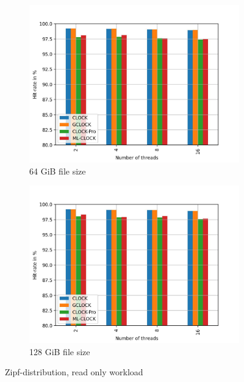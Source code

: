 \documentclass[
	12pt,
	a4paper,
	abstract,
	bibliography=totoc,
	chapterprefix,
	headings=openright,
	numbers=endperiod,
	parskip=half,
	twoside,
]{scrreprt}
\begin{document}
\begin{figure}[H]
\begin{subfigure}{0.4\textwidth}
		\includegraphics[width=\textwidth]{multi_64_gb_randread_zipf.jpg}		
		\caption{64 GiB file size}
		\label{fig:read 64 zipf}
	\end{subfigure}
	\hfill
	\begin{subfigure}{0.4\textwidth}
		\includegraphics[width=\textwidth]{multi_128_gb_randread_zipf.jpg}		
		\caption{128 GiB file size}
		\label{fig:read 128 zipf}
	\end{subfigure}
	\caption{Zipf-distribution, read only workload}
	\label{fig:multi zipf read only}
\end{figure}
\end{document}
